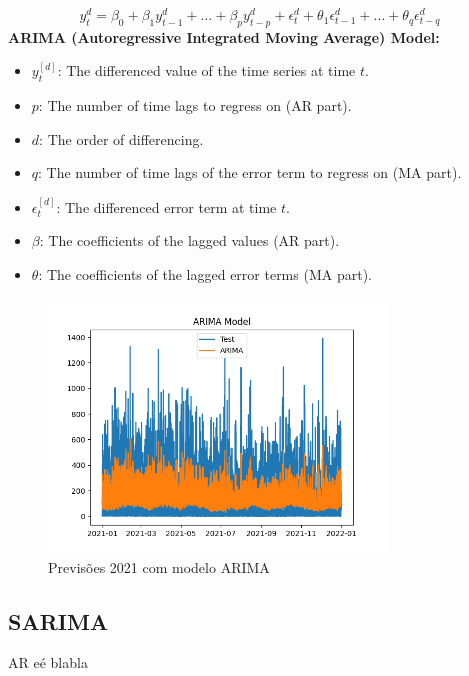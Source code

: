 \begin{equation} \label{eq:ARIMA}y_t^d = \beta_0 + \beta_1 y_{t-1}^d + \dots + \beta_p y_{t-p}^d + \epsilon_t^d + \theta_1 \epsilon_{t-1}^d + \dots + \theta_q \epsilon_{t-q}^d \end{equation}
\textbf{ARIMA (Autoregressive Integrated Moving Average) Model:}
\begin{itemize}
  \item $y_t^{[d]}$: The differenced value of the time series at time $t$.
  \item $p$: The number of time lags to regress on (AR part).
  \item $d$: The order of differencing.
  \item $q$: The number of time lags of the error term to regress on (MA part).
  \item $\epsilon_t^{[d]}$: The differenced error term at time $t$.
  \item $\beta$: The coefficients of the lagged values (AR part).
  \item $\theta$: The coefficients of the lagged error terms (MA part).
\end{itemize}

\begin{figure}[H]
    \centering
    \includegraphics[width=0.8\textwidth]{../plots/ARIMA_model.png}
    \caption{Previsões 2021 com modelo ARIMA}
    \label{fig:ARIMA_model}
\end{figure}

\subsection{SARIMA}

AR eé blabla



